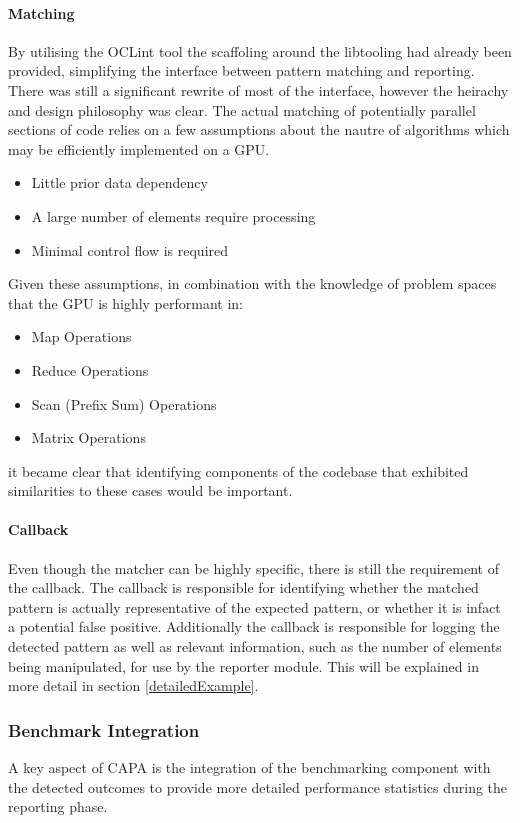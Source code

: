 \paragraph{Matching}
By utilising the OCLint tool the scaffoling around the libtooling had already been provided,
simplifying the interface between pattern matching and reporting. There was still a significant
rewrite of most of the interface, however the heirachy and design philosophy was clear. The actual
matching of potentially parallel sections of code relies on a few assumptions about the nautre of
algorithms which may be efficiently implemented on a GPU.
\begin{itemize}
    \item Little prior data dependency
    \item A large number of elements require processing
    \item Minimal control flow is required
\end{itemize}
Given these assumptions, in combination with the knowledge of problem spaces that the GPU is highly
performant in:
\begin{itemize}
    \item Map Operations
    \item Reduce Operations
    \item Scan (Prefix Sum) Operations
    \item Matrix Operations
\end{itemize}
it became clear that identifying components of the codebase that exhibited similarities to these
cases would be important. 

\paragraph{Callback}
Even though the matcher can be highly specific, there is still the requirement of the callback. The
callback is responsible for identifying whether the matched pattern is actually representative of
the expected pattern, or whether it is infact a potential false positive. Additionally the callback
is responsible for logging the detected pattern as well as relevant information, such as the number
of elements being manipulated, for use by the reporter module. This will be explained in more detail
in section \ref{detailedExample}.

\subsubsection{Benchmark Integration}
A key aspect of CAPA is the integration of the benchmarking component with the detected outcomes to
provide more detailed performance statistics during the reporting phase.

